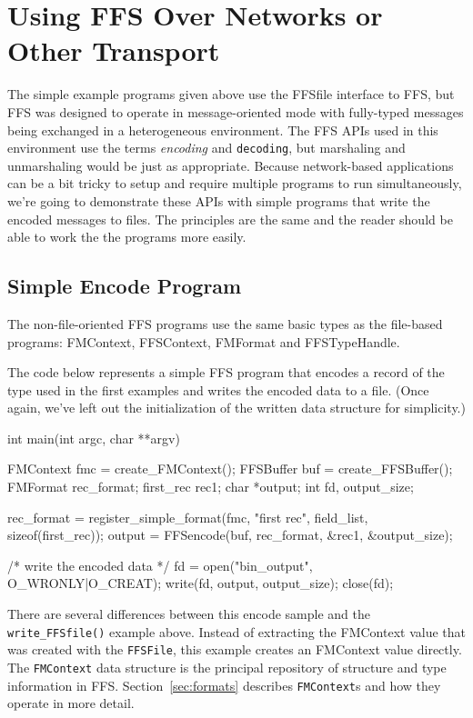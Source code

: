 \section{Using FFS Over Networks or Other Transport}

The simple example programs given above use the FFSfile interface to FFS,
but FFS was designed to operate in message-oriented mode with fully-typed
messages being exchanged in a heterogeneous environment.  The FFS APIs used
in this environment use the terms {\em encoding} and {\tt decoding}, but
marshaling and unmarshaling would be just as appropriate.  Because
network-based applications can be a bit tricky to setup and require multiple
programs to run simultaneously, we're going to demonstrate these APIs with
simple programs that write the encoded messages to files.  The principles
are the same and the reader should be able to work the the programs more
easily.

\subsection{Simple Encode Program\label{encode}}

The non-file-oriented FFS programs use the same basic types as the
file-based programs: FMContext, FFSContext, FMFormat and FFSTypeHandle.

The code below represents a simple FFS program that encodes a record of the
type used in the first examples and writes the encoded data to a file.  
(Once again, we've left out the initialization of the written data structure
for simplicity.)
\begin{Code}
int main(int argc, char **argv)
{
    FMContext fmc = create_FMContext();
    FFSBuffer buf = create_FFSBuffer();
    FMFormat rec_format;
    first_rec rec1;
    char *output;
    int fd, output_size;

    rec_format = register_simple_format(fmc, "first rec", field_list, sizeof(first_rec));
    output = FFSencode(buf, rec_format, &rec1, &output_size);

    /* write the encoded data */
    fd = open("bin_output", O_WRONLY|O_CREAT);
    write(fd, output, output_size);
    close(fd);
}
\end{Code}
There are several differences between this encode sample and the
{\tt write\_FFSfile()} example above.  Instead of extracting the FMContext value
that was created with the {\tt FFSFile}, this example creates an FMContext value
directly.  The {\tt FMContext} data structure is the principal repository of
structure and type information in FFS.  Section~\ref{sec:formats} describes
{\tt FMContext}s and how they operate in more detail.

